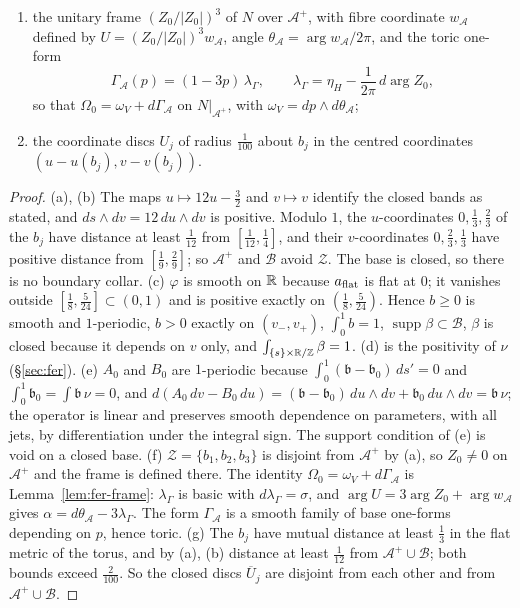 \begin{proposition}
\begin{enumerate}[label=(\alph*)]
\[\]
\item the unitary frame $(Z_0/|Z_0|)^3$ of $N$ over $\mathcal A^+$, with fibre coordinate $w_{\mathcal A}$ defined by
$U=(Z_0/|Z_0|)^3w_{\mathcal A}$, angle $\theta_{\mathcal A}=\arg w_{\mathcal A}/2\pi$, and the toric one-form
\[
 \Gamma_{\mathcal A}(p)=(1-3p)\,\lambda_\Gamma,\qquad \lambda_\Gamma=\eta_H-\frac1{2\pi}\,d\arg Z_0 ,
\]
so that $\Omega_0=\omega_V+d\Gamma_{\mathcal A}$ on $N|_{\mathcal A^+}$, with $\omega_V=dp\wedge d\theta_{\mathcal A}$;
\item the coordinate discs $U_j$ of radius $\frac1{100}$ about $b_j$ in the centred coordinates
$(u-u(b_j),v-v(b_j))$.
\end{enumerate}
\end{proposition}

\begin{proof}
(a), (b) The maps $u\mapsto12u-\frac32$ and $v\mapsto v$ identify the closed bands as stated, and $ds\wedge dv=12\,du\wedge dv$ is
positive. Modulo $1$, the $u$-coordinates $0,\frac13,\frac23$ of the $b_j$ have distance at least $\frac1{12}$ from
$[\frac1{12},\frac14]$, and their $v$-coordinates $0,\frac23,\frac13$ have positive distance from $[\frac19,\frac29]$;
so $\mathcal A^+$ and $\mathcal B$ avoid $\mathcal Z$. The base is closed, so there is no boundary collar.
(c) $\varphi$ is smooth on $\mathbb{R}$ because $a_{\rm flat}$ is flat at $0$; it vanishes outside $[\frac18,\frac5{24}]\subset(0,1)$ and is
positive exactly on $(\frac18,\frac5{24})$. Hence $b\ge0$ is smooth and $1$-periodic, $b>0$ exactly on $(v_-,v_+)$,
$\int_0^1b=1$, $\operatorname{supp}\beta\subset\mathcal B$, $\beta$ is closed because it depends on $v$ only, and
$\int_{\{s\}\times\mathbb{R}/\mathbb{Z}}\beta=1$.
(d) is the positivity of $\nu$ (\S\ref{sec:fer}).
(e) $A_0$ and $B_0$ are $1$-periodic because $\int_0^1(\mathfrak b-\mathfrak b_0)\,ds'=0$ and $\int_0^1\mathfrak b_0=\int\mathfrak b\,\nu=0$,
and $d(A_0\,dv-B_0\,du)=(\mathfrak b-\mathfrak b_0)\,du\wedge dv+\mathfrak b_0\,du\wedge dv=\mathfrak b\,\nu$; the operator is linear and
preserves smooth dependence on parameters, with all jets, by differentiation under the integral sign. The support
condition of (e) is void on a closed base.
(f) $\mathcal Z=\{b_1,b_2,b_3\}$ is disjoint from $\mathcal A^+$ by (a), so $Z_0\ne0$ on $\mathcal A^+$ and the frame
is defined there. The identity $\Omega_0=\omega_V+d\Gamma_{\mathcal A}$ is Lemma~\ref{lem:fer-frame}: $\lambda_\Gamma$ is basic
with $d\lambda_\Gamma=\sigma$, and $\arg U=3\arg Z_0+\arg w_{\mathcal A}$ gives $\alpha=d\theta_{\mathcal A}-3\lambda_\Gamma$. The form
$\Gamma_{\mathcal A}$ is a smooth family of base one-forms depending on $p$, hence toric.
(g) The $b_j$ have mutual distance at least $\frac13$ in the flat metric of the torus, and by (a), (b) distance at least
$\frac1{12}$ from $\mathcal A^+\cup\mathcal B$; both bounds exceed $\frac2{100}$. So the closed discs $\overline U_j$ are disjoint from
each other and from $\mathcal A^+\cup\mathcal B$.
\end{proof}


